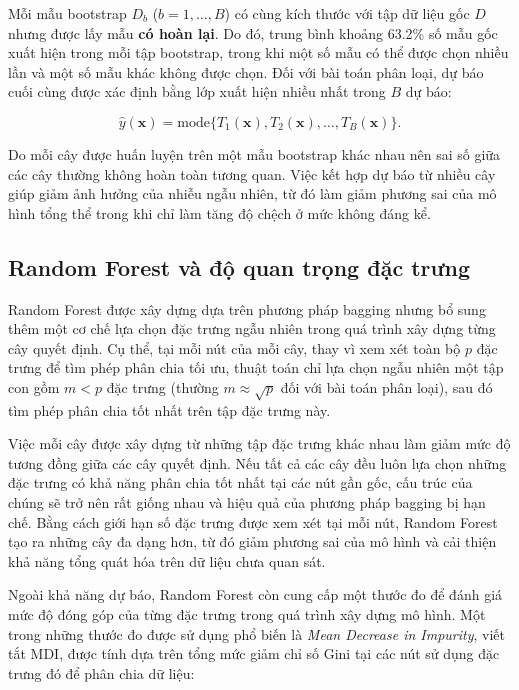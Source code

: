 \documentclass[a4paper]{report}
\begin{document}
Mỗi mẫu bootstrap $D_b$ ($b = 1, \ldots, B$) có cùng kích thước với tập dữ liệu
gốc $D$ nhưng được lấy mẫu \textbf{có hoàn lại}. Do đó, trung bình khoảng
63.2\% số mẫu gốc xuất hiện trong mỗi tập bootstrap, trong khi một số mẫu có
thể được chọn nhiều lần và một số mẫu khác không được chọn. Đối với bài toán
phân loại, dự báo cuối cùng được xác định bằng lớp xuất hiện nhiều nhất trong
$B$ dự báo:

\[
  \hat{y}(\mathbf{x}) = \text{mode}\big\{ T_1(\mathbf{x}), T_2(\mathbf{x}),
  \ldots, T_B(\mathbf{x}) \big\}.
\]

Do mỗi cây được huấn luyện trên một mẫu bootstrap khác nhau nên sai số giữa các
cây thường không hoàn toàn tương quan. Việc kết hợp dự báo từ nhiều cây giúp
giảm ảnh hưởng của nhiễu ngẫu nhiên, từ đó làm giảm phương sai của mô hình tổng
thể trong khi chỉ làm tăng độ chệch ở mức không đáng kể.

\subsection{Random Forest và độ quan trọng đặc trưng}

Random Forest được xây dựng dựa trên phương pháp bagging nhưng bổ sung thêm
một cơ chế lựa chọn đặc trưng ngẫu nhiên trong quá trình xây dựng từng cây
quyết định. Cụ thể, tại mỗi nút của mỗi cây, thay vì xem xét toàn bộ $p$ đặc
trưng để tìm phép phân chia tối ưu, thuật toán chỉ lựa chọn ngẫu nhiên một tập
con gồm $m < p$ đặc trưng (thường $m \approx \sqrt{p}$ đối với bài toán phân
loại), sau đó tìm phép phân chia tốt nhất trên tập đặc trưng này.

Việc mỗi cây được xây dựng từ những tập đặc trưng khác nhau làm giảm mức độ
tương đồng giữa các cây quyết định. Nếu tất cả các cây đều luôn lựa chọn những
đặc trưng có khả năng phân chia tốt nhất tại các nút gần gốc, cấu trúc của
chúng sẽ trở nên rất giống nhau và hiệu quả của phương pháp bagging bị hạn chế.
Bằng cách giới hạn số đặc trưng được xem xét tại mỗi nút, Random Forest tạo ra
những cây đa dạng hơn, từ đó giảm phương sai của mô hình và cải thiện khả năng
tổng quát hóa trên dữ liệu chưa quan sát.

\label{sec:rf_importance}

Ngoài khả năng dự báo, Random Forest còn cung cấp một thước đo để đánh giá mức
độ đóng góp của từng đặc trưng trong quá trình xây dựng mô hình. Một trong
những thước đo được sử dụng phổ biến là \textit{Mean Decrease in Impurity},
viết tắt MDI, được tính dựa trên tổng mức giảm chỉ số Gini tại các nút sử dụng
đặc trưng đó để phân chia dữ liệu:
\end{document}
